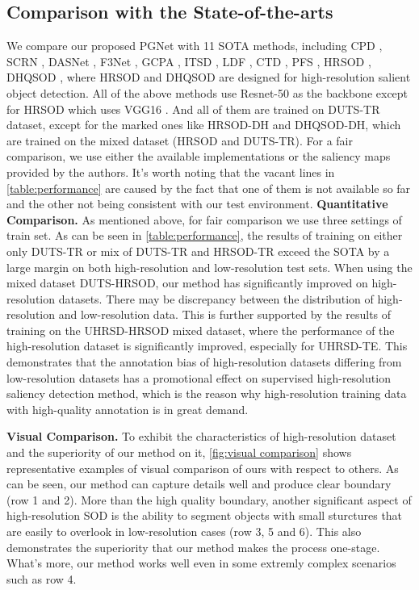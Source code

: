 \documentclass[10pt,twocolumn,letterpaper]{article}
\begin{document}
\subsection{Comparison with the State-of-the-arts}
We compare our proposed PGNet with 11 SOTA methods, including CPD \cite{wu2019cascaded}, SCRN \cite{wu2019stacked}, DASNet \cite{zhao2020depth}, F3Net \cite{wei2020f3net}, GCPA \cite{chen2020global}, ITSD \cite{zhou2020interactive}, LDF \cite{wei2020label}, CTD \cite{zhao2021complementary}, PFS \cite{ma2021pyramidal}, HRSOD \cite{zeng2019towards}, DHQSOD \cite{tang2021disentangled}, where HRSOD and DHQSOD are designed for high-resolution salient object detection.  All of the above methods use Resnet-50\cite{he2016deep} as the backbone except for HRSOD which uses VGG16 \cite{simonyan2014very}. And all of them are trained on DUTS-TR \cite{wang2017learning} dataset, except for the marked ones like HRSOD-DH and DHQSOD-DH, which are trained on the mixed dataset (HRSOD \cite{zeng2019towards} and DUTS-TR). For a fair comparison, we use either the available implementations or the saliency maps provided by the authors. It's worth noting that the vacant lines in \cref{table:performance} are caused by the fact that one of them is not available so far and the other not being consistent with our test environment.
\newpage
\textbf{Quantitative Comparison.}
As mentioned above, for fair comparison we use three settings of train set. As can be seen in \cref{table:performance}, the results of training on either only DUTS-TR or mix of DUTS-TR and HRSOD-TR exceed the SOTA by a large margin on both high-resolution and low-resolution test sets. When using the mixed dataset DUTS-HRSOD, our method has significantly improved on high-resolution datasets. There may be discrepancy between the distribution of high-resolution and low-resolution data. This is further supported by the results of training on the  UHRSD-HRSOD mixed dataset, where the performance of the high-resolution dataset is significantly improved, especially for UHRSD-TE. This demonstrates that the annotation bias of high-resolution datasets differing from low-resolution datasets has a promotional effect on supervised high-resolution saliency detection method, which is the reason why high-resolution training data with high-quality annotation is in great demand.

\textbf{Visual Comparison.}
To exhibit the characteristics of high-resolution dataset and the superiority of our method on it, \cref{fig:visual comparison} shows representative examples of visual comparison of ours with respect to others. As can be seen, our method can capture details well and produce clear boundary (row 1 and 2). More than the high quality boundary, another significant aspect of high-resolution SOD is the ability to segment objects with small sturctures that are easily to overlook in low-resolution cases (row 3, 5 and 6). This also demonstrates the superiority that our method makes the process one-stage. What's more, our method works well even in some extremly complex scenarios such as row 4.
\end{document}
